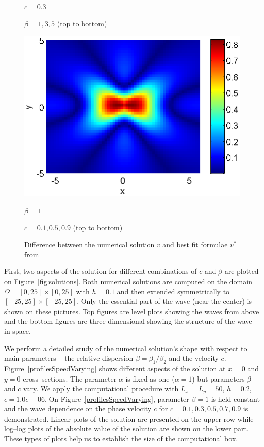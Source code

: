 \documentclass{article}
\begin{document}
\begin{figure}[htbp]
\begin{minipage}[b]{0.48\linewidth}
		\centerline{$c=0.3$}
		\centerline{$\beta = 1,3,5$ (top to bottom) }
	\end{minipage}
	\begin{minipage}[b]{0.48\linewidth}
		\raggedright
		 \includegraphics[width=\linewidth]{../EllipticEquationSJC/differences/difference_c=09_beta=1.eps}
		\centerline{$\beta = 1$}
		\centerline{$c = 0.1, 0.5, 0.9$ (top to bottom)}
	\end{minipage}
	\caption{Difference between the numerical solution $v$ and best fit formulae $v^*$ from \cite{Ch2011} }
	\label{fig:difference}
\end{figure}

First, two aspects of the solution for different combinations of  $c$ and $\beta$   are plotted  on Figure~\ref{fig:solutions}. Both numerical solutions are computed on the  domain $\Omega = [0, 25]\times [0, 25]$ with $h = 0.1$ and then extended symmetrically to $ [-25, 25]\times [-25, 25]$. 
Only the essential part of the wave (near the center) is shown on these pictures. Top figures are level plots showing the waves from above and the bottom figures are 
three dimensional showing the structure of the wave in space. 



We perform a detailed study   of the numerical solution's shape with respect to main parameters -- the relative dispersion $\beta=\beta_1 / \beta_2$ and the velocity $c$.
 Figure~\ref{profilesSpeedVarying} shows different aspects of the solution at $x=0$ and $y=0$ cross--sections. The parameter $\alpha$  is fixed as one ($\alpha = 1$) but  parameters $\beta $ and $c$ vary. We apply  the computational procedure with  $L_x = L_y = 50$, $h = 0.2$, $\epsilon = 1.0e-06$. 
On Figure~\ref{profilesSpeedVarying}, parameter $\beta=1$ is held constant and the wave dependence on the phase velocity  $c$ for $c=0.1, 0.3, 0.5, 0.7, 0.9$ is demonstrated.  Linear plots of the solution are presented on the upper row while  log--log plots of the absolute value of the solution are shown on the lower part.  These types of plots help us to establish the size of the computational box. 
\end{document}
